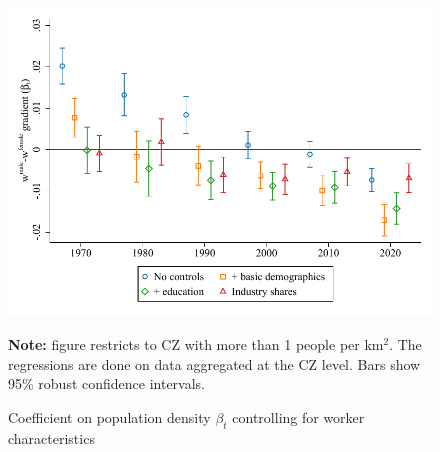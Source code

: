 \begin{figure}[!h]
\centering
\caption{Coefficient on population density $ \beta_t $ controlling for worker characteristics}
\includegraphics[width=.6\textwidth]{../2_analysis/output/figures/with_control_gradients_l_czone_density_full_time}
\par \begin{minipage}[h]{\textwidth}{\scriptsize\textbf{Note:} figure restricts to CZ with more than 1 people per km$^2$. The regressions are done on data aggregated at the CZ level. Bars show 95\% robust confidence intervals.}\end{minipage}
\end{figure}
